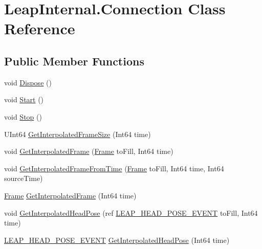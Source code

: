 \hypertarget{class_leap_internal_1_1_connection}{}\section{Leap\+Internal.\+Connection Class Reference}
\label{class_leap_internal_1_1_connection}
\subsection*{Public Member Functions}
\begin{DoxyCompactItemize}
\item 
void \mbox{\hyperlink{class_leap_internal_1_1_connection_a6cb6643d7795ebf5be07be51d8150dbf}{Dispose}} ()
\item 
void \mbox{\hyperlink{class_leap_internal_1_1_connection_a33962c567068d008ec6779c2641584b0}{Start}} ()
\item 
void \mbox{\hyperlink{class_leap_internal_1_1_connection_aea1fa03cd6daf0b54561ff2221a8f3be}{Stop}} ()
\item 
U\+Int64 \mbox{\hyperlink{class_leap_internal_1_1_connection_aa148c941081bf9d79516bdba29f4195a}{Get\+Interpolated\+Frame\+Size}} (Int64 time)
\item 
void \mbox{\hyperlink{class_leap_internal_1_1_connection_a6162a9db0b86aec5d517b316136c31c7}{Get\+Interpolated\+Frame}} (\mbox{\hyperlink{class_leap_1_1_frame}{Frame}} to\+Fill, Int64 time)
\item 
void \mbox{\hyperlink{class_leap_internal_1_1_connection_a810b5d68c8fc21d2080a3cc60ad50520}{Get\+Interpolated\+Frame\+From\+Time}} (\mbox{\hyperlink{class_leap_1_1_frame}{Frame}} to\+Fill, Int64 time, Int64 source\+Time)
\item 
\mbox{\hyperlink{class_leap_1_1_frame}{Frame}} \mbox{\hyperlink{class_leap_internal_1_1_connection_af2f03c0120eeadd2c5c4b394b0991a14}{Get\+Interpolated\+Frame}} (Int64 time)
\item 
void \mbox{\hyperlink{class_leap_internal_1_1_connection_a96355324ac7bacf3f563a45cebb5f878}{Get\+Interpolated\+Head\+Pose}} (ref \mbox{\hyperlink{struct_leap_internal_1_1_l_e_a_p___h_e_a_d___p_o_s_e___e_v_e_n_t}{L\+E\+A\+P\+\_\+\+H\+E\+A\+D\+\_\+\+P\+O\+S\+E\+\_\+\+E\+V\+E\+NT}} to\+Fill, Int64 time)
\item 
\mbox{\hyperlink{struct_leap_internal_1_1_l_e_a_p___h_e_a_d___p_o_s_e___e_v_e_n_t}{L\+E\+A\+P\+\_\+\+H\+E\+A\+D\+\_\+\+P\+O\+S\+E\+\_\+\+E\+V\+E\+NT}} \mbox{\hyperlink{class_leap_internal_1_1_connection_a996b3f40f20bb45366b2f3b063b720b4}{Get\+Interpolated\+Head\+Pose}} (Int64 time)

\end{DoxyCompactItemize}
